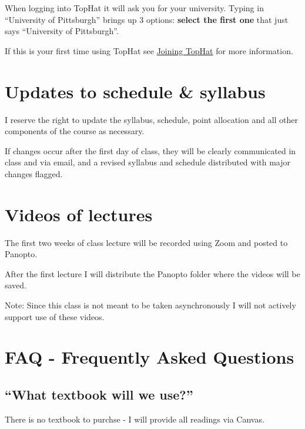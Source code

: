 \documentclass[
]{book}
\begin{document}
When logging into TopHat it will ask you for your university. Typing in ``University of Pittsburgh'' brings up 3 options: \textbf{select the first one} that just says ``University of Pittsburgh''.

If this is your first time using TopHat see \href{https://canvas.pitt.edu/courses/106737/pages/joining-tophat?module_item_id=2272350}{Joining TopHat} for more information.

\hypertarget{updates-to-schedule-syllabus}{%
\chapter{Updates to schedule \& syllabus}\label{updates-to-schedule-syllabus}}

I reserve the right to update the syllabus, schedule, point allocation and all other components of the course as necessary.

If changes occur after the first day of class, they will be clearly communicated in class and via email, and a revised syllabus and schedule distributed with major changes flagged.

\hypertarget{videos-of-lectures}{%
\chapter{Videos of lectures}\label{videos-of-lectures}}

The first two weeks of class lecture will be recorded using Zoom and posted to Panopto.

After the first lecture I will distribute the Panopto folder where the videos will be saved.

Note: Since this class is not meant to be taken asynchronously I will not actively support use of these videos.

\hypertarget{faq---frequently-asked-questions}{%
\chapter{FAQ - Frequently Asked Questions}\label{faq---frequently-asked-questions}}

\hypertarget{what-textbook-will-we-use}{%
\section{``What textbook will we use?''}\label{what-textbook-will-we-use}}

There is no textbook to purchse - I will provide all readings via Canvas.
\end{document}
